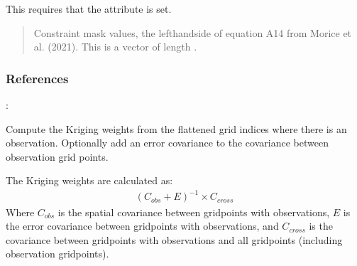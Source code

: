 \documentclass[letterpaper,10pt,english]{sphinxmanual}
\begin{document}
\begin{fulllineitems}
\begin{fulllineitems}
\sphinxAtStartPar
This requires that the  attribute is set.
\begin{quote}\begin{description}
\sphinxAtStartPar
{} \textendash{} Constraint mask values, the left\sphinxhyphen{}hand\sphinxhyphen{}side of equation A14 from
Morice et al. (2021). This is a vector of length .

\sphinxAtStartPar
{}

\end{description}\end{quote}
\subsubsection*{References}

\sphinxAtStartPar
{}: 

\end{fulllineitems}


\begin{fulllineitems}
\label{\detokenize{kriging:glomar_gridding.kriging.SimpleKriging.get_kriging_weights}}
\pysigstartsignatures
\pysiglinewithargsret
{}
{}
{}
\pysigstopsignatures
\sphinxAtStartPar
Compute the Kriging weights from the flattened grid indices where
there is an observation. Optionally add an error covariance to the
covariance between observation grid points.

\sphinxAtStartPar
The Kriging weights are calculated as:
\begin{equation*}
\begin{split}(C_{obs} + E)^{-1} \times C_{cross}\end{split}
\end{equation*}
\sphinxAtStartPar
Where \(C_{obs}\) is the spatial covariance between grid\sphinxhyphen{}points
with observations, \(E\) is the error covariance between grid\sphinxhyphen{}points
with observations, and \(C_{cross}\) is the covariance between
grid\sphinxhyphen{}points with observations and all grid\sphinxhyphen{}points (including observation
grid\sphinxhyphen{}points).


\end{fulllineitems}
\end{fulllineitems}
\end{document}
